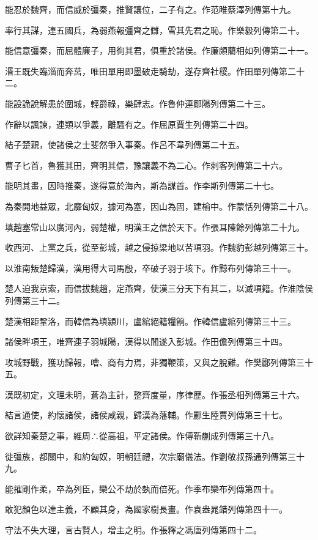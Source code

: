 能忍於魏齊，而信威於彊秦，推賢讓位，二子有之。作范睢蔡澤列傳第十九。

率行其謀，連五國兵，為弱燕報彊齊之讎，雪其先君之恥。作樂毅列傳第二十。

能信意彊秦，而屈體廉子，用徇其君，俱重於諸侯。作廉頗藺相如列傳第二十一。

湣王既失臨淄而奔莒，唯田單用即墨破走騎劫，遂存齊社稷。作田單列傳第二十二。

能設詭說解患於圍城，輕爵祿，樂肆志。作魯仲連鄒陽列傳第二十三。

作辭以諷諫，連類以爭義，離騷有之。作屈原賈生列傳第二十四。

結子楚親，使諸侯之士斐然爭入事秦。作呂不韋列傳第二十五。

曹子匕首，魯獲其田，齊明其信，豫讓義不為二心。作刺客列傳第二十六。

能明其畫，因時推秦，遂得意於海內，斯為謀首。作李斯列傳第二十七。

為秦開地益眾，北靡匈奴，據河為塞，因山為固，建榆中。作蒙恬列傳第二十八。

填趙塞常山以廣河內，弱楚權，明漢王之信於天下。作張耳陳餘列傳第二十九。

收西河、上黨之兵，從至彭城，越之侵掠梁地以苦項羽。作魏豹彭越列傳第三十。

以淮南叛楚歸漢，漢用得大司馬殷，卒破子羽于垓下。作黥布列傳第三十一。

楚人迫我京索，而信拔魏趙，定燕齊，使漢三分天下有其二，以滅項籍。作淮陰侯列傳第三十二。

楚漢相距鞏洛，而韓信為填潁川，盧綰絕籍糧餉。作韓信盧綰列傳第三十三。

諸侯畔項王，唯齊連子羽城陽，漢得以閒遂入彭城。作田儋列傳第三十四。

攻城野戰，獲功歸報，噲、商有力焉，非獨鞭策，又與之脫難。作樊酈列傳第三十五。

漢既初定，文理未明，蒼為主計，整齊度量，序律歷。作張丞相列傳第三十六。

結言通使，約懷諸侯，諸侯咸親，歸漢為藩輔。作酈生陸賈列傳第三十七。

欲詳知秦楚之事，維周∴從高祖，平定諸侯。作傅靳蒯成列傳第三十八。

徙彊族，都關中，和約匈奴，明朝廷禮，次宗廟儀法。作劉敬叔孫通列傳第三十九。

能摧剛作柔，卒為列臣，欒公不劫於埶而倍死。作季布欒布列傳第四十。

敢犯顏色以達主義，不顧其身，為國家樹長畫。作袁盎晁錯列傳第四十一。

守法不失大理，言古賢人，增主之明。作張釋之馮唐列傳第四十二。

